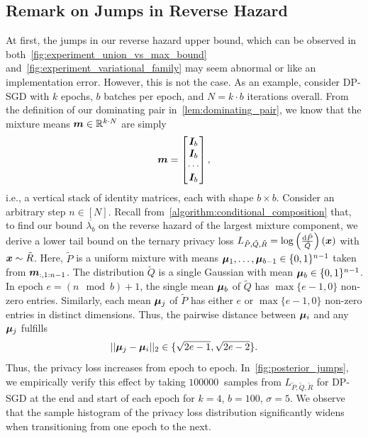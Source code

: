 \subsection{Remark on Jumps in Reverse Hazard}
At first, the jumps in our reverse hazard upper bound, which can be observed in both~\cref{fig:experiment_union_vs_max_bound} and~\cref{fig:experiment_variational_family} may seem abnormal or like an implementation error.
However, this is not the case. As an example, consider DP-SGD with $k$ epochs, $b$ batches per epoch, and $N = k \cdot b$ iterations overall. From the definition of our dominating pair in~\cref{lem:dominating_pair}, we know that the mixture means ${\bm{m}} \in {\mathbb{R}}^{k \cdot N}$ are simply
\begin{equation*}
    {\bm{m}} = \begin{bmatrix}
        {\bm{I}}_{b}\\
        {\bm{I}}_{b}\\
        \cdots\\
        {\bm{I}}_{b}
    \end{bmatrix},
\end{equation*}
i.e., a vertical stack of identity matrices, each with shape $b \times b$.
Consider an arbitrary step $n \in [N]$.
Recall from~\cref{algorithm:conditional_composition} that, to find our bound $\overline{\lambda_b}$ on the reverse hazard of the largest mixture component, we derive a lower tail bound on the ternary privacy loss $L_{\tilde{P}, \tilde{Q},\tilde{R}} = \log\left(\frac{\mathrm{d} \tilde{P}}{\tilde{Q}}\right)({\bm{x}})$ with ${\bm{x}} \sim \tilde{R}$. Here, $\tilde{P}$ is a uniform mixture with means ${\bm{\mu}}_1, \dots, {\bm{\mu}}_{b-1} \in \{0,1\}^{n-1}$ taken from ${\bm{m}}_{:, 1:n-1}$.
The distribution $\tilde{Q}$ is a single Gaussian with mean ${\bm{\mu}}_b \in \{0,1\}^{n-1}$.
In epoch $e = (n \mod b) + 1$, the single mean ${\bm{\mu}}_b$ of $\tilde{Q}$ has $\max\{e-1, 0\}$ non-zero entries.
Similarly, each mean ${\bm{\mu}}_j$ of $\tilde{P}$ has either $e$ or $\max\{e-1,0\}$ non-zero entries in distinct dimensions.
Thus, the pairwise distance between ${\bm{\mu}}_i$ and any ${\bm{\mu}}_j$ fulfills
\begin{equation*}
    ||{\bm{\mu}}_j - {\bm{\mu}}_i||_2 \in \{\sqrt{2e-1}, \sqrt{2e-2}\}.
\end{equation*}
Thus, the privacy loss increases from epoch to epoch.
In~\cref{fig:posterior_jumps}, we empirically verify this effect by taking $\SI{100000}{}$ samples from $L_{\tilde{P}, \tilde{Q}, \tilde{R}}$
for DP-SGD at the end and start of each epoch for $k=4$, $b=100$, $\sigma=5$.
We observe that the sample histogram of the privacy loss distribution significantly widens when transitioning from one epoch to the next.


